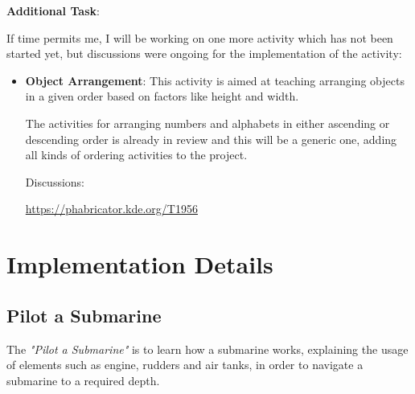 \documentclass[preprint,12pt]{elsarticle}
\begin{document}





\textbf{Additional Task}:

If time permits me, I will be working on one more activity which has not been started yet, but discussions were ongoing for the implementation of the activity:

\begin{itemize}

\item \textbf{Object Arrangement}: This activity is aimed at teaching arranging objects in a given order based on factors like height and width.

The activities for arranging numbers and alphabets in either ascending or descending order is already in review and this will be a generic one, adding all kinds of ordering activities to the project.

Discussions:

\href{https://phabricator.kde.org/T1956}{https://phabricator.kde.org/T1956}
\end{itemize}

\section{Implementation Details}
\label{S:1}

\subsection{Pilot a Submarine}

The  \textit{"Pilot a Submarine"} is to learn how a submarine works, explaining the usage of elements such as engine, rudders and air tanks, in order to navigate a submarine to a required depth.
\end{document}
